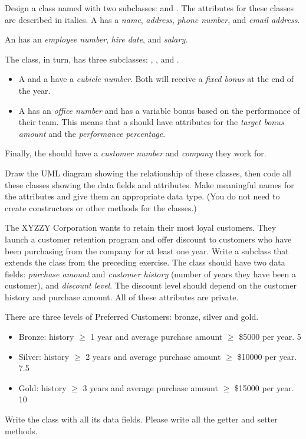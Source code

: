 \begin{exercise}
Design a class named  with two subclasses:  and . The attributes for these classes are described in italics. A  has a {\em name}, {\em address}, {\em phone number}, and  {\em email address}.

An  has an {\em employee number}, {\em hire date}, and {\em salary}.

The  class, in turn, has three subclasses: , , and . 
\begin{itemize}
\item A  and a  have a {\em cubicle number}. Both will receive a {\em fixed bonus} at the end of the year.
\item A  has an {\em office number} and has a variable bonus based on the performance of their team. This means that a  should have attributes for the {\em target bonus amount} and the {\em performance percentage}.
\end{itemize}

Finally, the  should have a {\em customer number} and {\em company} they work for.

Draw the UML diagram showing the relationship of these classes, then code all these classes showing the data fields and attributes. Make meaningful names for the attributes and give them an appropriate data type. (You do not need to create constructors or other methods for the classes.)
\end{exercise}

\begin{exercise}
The XYZZY Corporation wants to retain their most loyal customers. They launch a customer retention program and offer discount to customers who have been purchasing from the company for at least one year.
Write a subclass  that extends the  class from the preceding exercise. The  class should have two data fields: {\em purchase amount} and {\em customer history} (number of years they have been a customer), and {\em discount level}. The discount level should depend on the customer history and purchase amount. All of these attributes are private.

There are three levels of Preferred Customers: bronze, silver and gold.
\begin{itemize}
\item Bronze: history $\geq$ 1 year and average purchase amount $\geq$ \$5000 per year.  5%
\item Silver:  history $\geq$ 2 years and average purchase amount $\geq$ \$10000 per year. 7.5%
\item Gold:  history $\geq$ 3 years and average purchase amount $\geq$ \$15000 per year. 10%
\end{itemize}


Write the  class with all its data fields. Please write all the getter and setter methods. 
\end{exercise}

